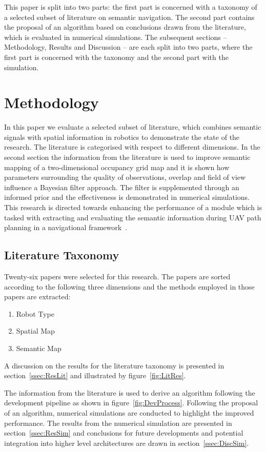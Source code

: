 \documentclass[twocolumn,letterpaper]{IEEEAerospaceCLS}  %
\begin{document}
This paper is split into two parts: the first part is concerned with a taxonomy of a selected subset of literature on semantic navigation. The second part contains the proposal of an algorithm based on conclusions drawn from the literature, which is evaluated in numerical simulations. The subsequent sections -- Methodology, Results and Discussion -- are each split into two parts, where the first part is concerned with the taxonomy and the second part with the simulation.   
\section{Methodology} \label{sec:Met}
In this paper we evaluate a selected subset of literature, which combines semantic signals with spatial information in robotics to demonstrate the state of the research. The literature is categorised with respect to different dimensions. In the second section the information from the literature is used to improve semantic mapping of a two-dimensional occupancy grid map and it is shown how parameters surrounding the quality of observations, overlap and field of view influence a Bayesian filter approach. The filter is supplemented through an informed prior and the effectiveness is demonstrated in numerical simulations. This research is directed towards enhancing the performance of a module which is tasked with extracting and evaluating the semantic information during UAV path planning in a navigational framework~\cite{mandel_towards_2020}.
\subsection{Literature Taxonomy} \label{ssec:MetLit}
Twenty-six papers were selected for this research. The papers are sorted according to the following three dimensions and the methods employed in those papers are extracted:
\begin{enumerate}
    \item Robot Type
    \item Spatial Map
    \item Semantic Map
\end{enumerate}
A discussion on the results for the literature taxonomy is presented in section~\ref{ssec:ResLit} and illustrated by figure~\ref{fig:LitRes}.

The information from the literature is used to derive an algorithm following the development pipeline as shown in figure~\ref{fig:DevProcess}. Following the proposal of an algorithm, numerical simulations are conducted to highlight the improved performance. The results from the numerical simulation are presented in section~\ref{ssec:ResSim} and conclusions for future developments and potential integration into higher level architectures are drawn in section~\ref{ssec:DiscSim}.
\end{document}
